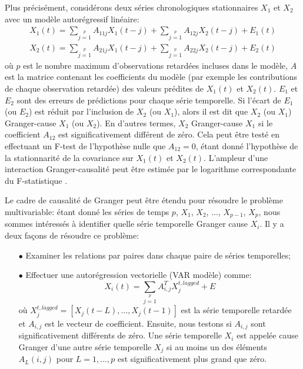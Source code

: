  Plus précisément, considérons deux séries chronologiques stationnaires $ X_1 $ et $ X_2 $ avec un modèle autorégressif linéaire:
\begin{equation}
\begin{array}{c}
 X_1(t) = \sum\limits_{j = 1}\limits^pA_{11j}X_1(t-j) + \sum\limits_{j = 1}\limits^pA_{12j}X_2(t-j) + E_1(t)\\
 X_2(t) = \sum\limits_{j = 1}\limits^pA_{21j}X_1(t-j) + \sum\limits_{j = 1}\limits^pA_{22j}X_2(t-j) + E_2(t)
\end{array}
\end{equation}
 où $p$ est le nombre maximum d'observations retardées incluses dans le modèle, $A$ est la matrice contenant les coefficients du modèle (par exemple les contributions de chaque observation retardée) des valeurs prédites de $X_1(t) $ et $X_2(t)$. $E_1$ et $E_2$ sont des erreurs de prédictions pour chaque série temporelle. Si l'écart de $E_1$ (ou $E_2$) est réduit par l'inclusion de $X_2$ (ou $X_1$), alors il est dit que $X_2$ (ou $X_1$) Granger-cause $X_1$ (ou $X_2$). En d'autres termes, $X_2$ Granger-cause $X_1$ si le coefficient $A_ {12}$ est significativement différent de zéro. Cela peut être testé en effectuant un F-test de l'hypothèse nulle que $A_{12} = 0$, étant donné l'hypothèse de la stationnarité de la covariance sur $X_1 (t)$ et $X_2(t)$. L'ampleur d'une interaction Granger-causalité peut être estimée par le logarithme correspondante du F-statistique \cite{geweke1982}.
 
Le cadre de causalité de Granger peut être étendu pour résoudre le problème multivariable: étant donné les séries de temps $ p $, $ X_1 $, $ X_2 $, ..., $ X_ {p-1} $, $ X_p $, nous sommes intéressés à identifier quelle série temporelle Granger cause $X_i$. Il y a deux façons de résoudre ce problème:
\begin{itemize} 
\item[$\bullet$] Examiner les relations par paires dans chaque paire de séries temporelles;
\item[$\bullet$] Effectuer une autorégression vectorielle (VAR modèle) comme:
 \begin{equation}
 X_i(t) = \sum\limits_{j = 1}\limits^pA_{i, j}^TX_j^{t, lagged} + E
\end{equation}
 où $X_j^{t, lagged} = [X_j (t - L), ..., X_j (t - 1)] $ est la série temporelle retardée et $A_ {i, j}$ est le vecteur de coefficient. Ensuite, nous testons si $A_ {i, j}$ sont significativement différents de zéro. Une série temporelle $ {\displaystyle X_{i}} $ est appelée cause Granger d'une autre série temporelle $ {\displaystyle X_{j}} $ si au moins un des éléments $ {\displaystyle A_{L} (i, j)} $ pour $ {L = 1, \ldots, p} $ est significativement plus grand que zéro.
\end{itemize} 

